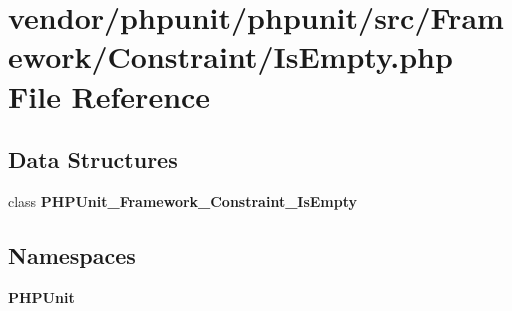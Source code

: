 \section{vendor/phpunit/phpunit/src/\+Framework/\+Constraint/\+Is\+Empty.php File Reference}
\label{_is_empty_8php}
\subsection*{Data Structures}
\begin{DoxyCompactItemize}
\item 
class {\bf P\+H\+P\+Unit\+\_\+\+Framework\+\_\+\+Constraint\+\_\+\+Is\+Empty}
\end{DoxyCompactItemize}
\subsection*{Namespaces}
\begin{DoxyCompactItemize}
\item 
 {\bf P\+H\+P\+Unit}
\end{DoxyCompactItemize}
